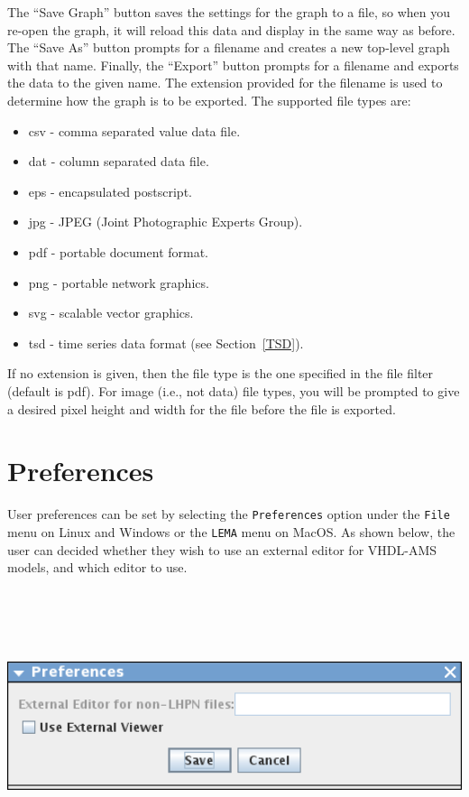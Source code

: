 \documentclass[titlepage,11pt]{article}
\begin{document}
The ``Save Graph'' button saves the settings for the graph to 
a file, so when you re-open the graph, it will reload this data and display 
in the same way as before.  The ``Save As'' button prompts for a 
filename and creates a new top-level graph with that name.  
Finally, the ``Export'' button prompts for a filename and exports
the data to the given name.  The extension provided for the filename 
is used to determine how the graph is to be exported. The
supported file types are: 
\begin{itemize}
\item csv - comma separated value data file. 
\item dat - column separated data file. 
\item eps - encapsulated postscript. 
\item jpg - JPEG (Joint Photographic Experts Group). 
\item pdf - portable document format.
\item png - portable network graphics. 
\item svg - scalable vector graphics.
\item tsd - time series data format (see Section~\ref{TSD}).
\end{itemize}
If no extension is given, then the file type is the one
specified in the file filter (default is pdf).  For image (i.e.,
not data) file types, you will be prompted to give a desired
pixel height and width for the file before the file is exported. 

\section{\label{Preferences}Preferences}

\noindent
User preferences can be set by selecting the {\tt Preferences} option
under the {\tt File} menu on Linux and Windows or the {\tt LEMA} 
menu on MacOS.  As shown below, the user can decided whether they wish
to use an external editor for VHDL-AMS models, and which editor to use.
\begin{center}
\includegraphics[height=80mm]{screenshots/preferenceLema} 
\end{center}
\end{document}
